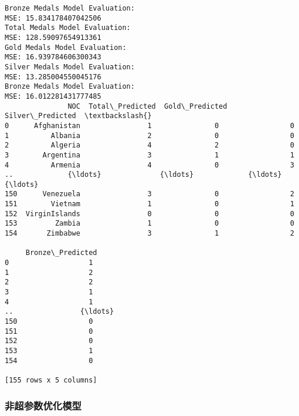 \documentclass[11pt]{article}
\begin{document}
\begin{Verbatim}[commandchars=\\\{\}]
Bronze Medals Model Evaluation:
MSE: 15.834178407042506
Total Medals Model Evaluation:
MSE: 128.59097654913361
Gold Medals Model Evaluation:
MSE: 16.939784606300343
Silver Medals Model Evaluation:
MSE: 13.285004550045176
Bronze Medals Model Evaluation:
MSE: 16.012281431777485
               NOC  Total\_Predicted  Gold\_Predicted  Silver\_Predicted  \textbackslash{}
0      Afghanistan                1               0                 0
1          Albania                2               0                 0
2          Algeria                4               2                 0
3        Argentina                3               1                 1
4          Armenia                4               0                 3
..             {\ldots}              {\ldots}             {\ldots}               {\ldots}
150      Venezuela                3               0                 2
151        Vietnam                1               0                 1
152  VirginIslands                0               0                 0
153         Zambia                1               0                 0
154       Zimbabwe                3               1                 2

     Bronze\_Predicted
0                   1
1                   2
2                   2
3                   1
4                   1
..                {\ldots}
150                 0
151                 0
152                 0
153                 1
154                 0

[155 rows x 5 columns]
    \end{Verbatim}

    \subsubsection{非超参数优化模型}\label{ux975eux8d85ux53c2ux6570ux4f18ux5316ux6a21ux578b}
\end{document}
